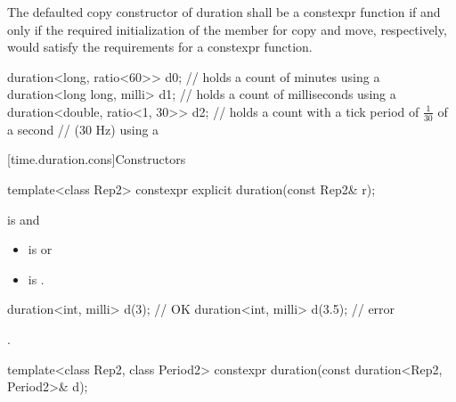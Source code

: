 \pnum
The defaulted copy constructor of duration shall be a
constexpr function if and only if the required initialization
of the member  for copy and move, respectively, would
satisfy the requirements for a constexpr function.

\pnum
\begin{example}
\begin{codeblock}
duration<long, ratio<60>> d0;       // holds a count of minutes using a 
duration<long long, milli> d1;      // holds a count of milliseconds using a 
duration<double, ratio<1, 30>>  d2; // holds a count with a tick period of $\frac{1}{30}$ of a second
                                    // (30 Hz) using a 
\end{codeblock}
\end{example}

[time.duration.cons]{Constructors}

%
\begin{itemdecl}
template<class Rep2>
  constexpr explicit duration(const Rep2& r);
\end{itemdecl}

\begin{itemdescr}
\pnum
\constraints
{} is  and
\begin{itemize}
\item {} is  or
\item {} is .
\end{itemize}
\begin{example}
\begin{codeblock}
duration<int, milli> d(3);          // OK
duration<int, milli> d(3.5);        // error
\end{codeblock}
\end{example}

\pnum
\ensures
{}.
\end{itemdescr}

%
\begin{itemdecl}
template<class Rep2, class Period2>
  constexpr duration(const duration<Rep2, Period2>& d);
\end{itemdecl}

